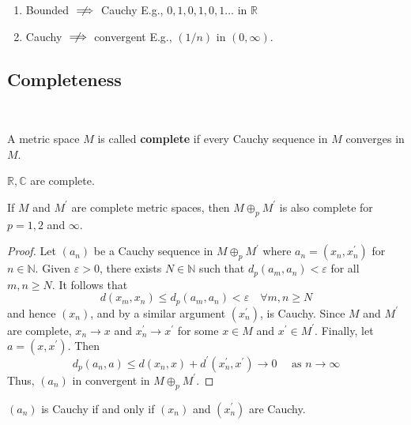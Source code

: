 \documentclass[a4paper,11pt]{article}
\begin{document}
\begin{remark}
\begin{enumerate}
    \item Bounded $\centernot\implies$ Cauchy E.g., $0,1,0,1,0,1 \ldots$ in $\mathbb{R}$
    \item Cauchy $\centernot\implies$ convergent E.g., $(1 / n)$ in $(0, \infty)$.
\end{enumerate}
\end{remark}

\subsection{Completeness}\ \vspace{-1.5em}
\begin{definition}
	A metric space \( M \) is called \textbf{complete} if every Cauchy sequence in \( M \) converges in \( M \).
\end{definition}
\begin{example}
	\( \mathbb R, \mathbb C \) are complete.
\end{example}
\begin{proposition}
    If $M$ and $M^{\prime}$ are complete metric spaces, then $M \oplus_p M^{\prime}$ is also complete for $p=1,2$ and $\infty$.
\end{proposition}
\begin{proof}
    Let $\left(a_n\right)$ be a Cauchy sequence in $M \oplus_p M^{\prime}$ where $a_n=\left(x_n, x_n^{\prime}\right)$ for $n \in \mathbb{N}$. Given $\varepsilon>0$, there exists $N \in \mathbb{N}$ such that $d_p\left(a_m, a_n\right)<\varepsilon$ for all $m, n \geqslant N$. It follows that
    \[
    d\left(x_m, x_n\right) \leqslant d_p\left(a_m, a_n\right)<\varepsilon \quad \forall m, n \geqslant N
    \]
    and hence $\left(x_n\right)$, and by a similar argument $\left(x_n^{\prime}\right)$, is Cauchy. Since $M$ and $M^{\prime}$ are complete, $x_n \rightarrow x$ and $x_n^{\prime} \rightarrow x^{\prime}$ for some $x \in M$ and $x^{\prime} \in M^{\prime}$. Finally, let $a=\left(x, x^{\prime}\right)$. Then
    \[
    d_p\left(a_n, a\right) \leqslant d\left(x_n, x\right)+d^{\prime}\left(x_n^{\prime}, x^{\prime}\right) \rightarrow 0 \quad \text { as } n \rightarrow \infty
    \]
    Thus, $\left(a_n\right)$ in convergent in $M \oplus_p M^{\prime}$.
\end{proof}
\begin{note}
    $\left(a_n\right)$ is Cauchy if and only if $\left(x_n\right)$ and $\left(x_n^{\prime}\right)$ are Cauchy.
\end{note}
\end{document}
